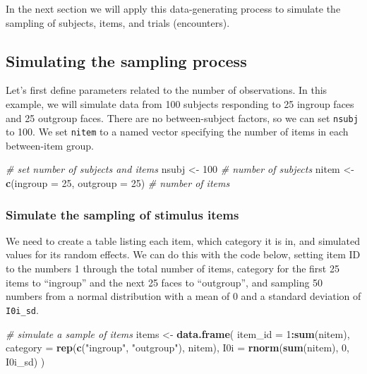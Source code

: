 \documentclass[doc,floatsintext]{apa6}
\newenvironment{Shaded}{\begin{snugshade}}{\end{snugshade}}
\newcommand{\CommentTok}[1]{\textcolor[rgb]{0.56,0.35,0.01}{\textit{#1}}}
\newcommand{\DataTypeTok}[1]{\textcolor[rgb]{0.13,0.29,0.53}{#1}}
\newcommand{\DecValTok}[1]{\textcolor[rgb]{0.00,0.00,0.81}{#1}}
\newcommand{\KeywordTok}[1]{\textcolor[rgb]{0.13,0.29,0.53}{\textbf{#1}}}
\newcommand{\NormalTok}[1]{#1}
\newcommand{\OperatorTok}[1]{\textcolor[rgb]{0.81,0.36,0.00}{\textbf{#1}}}
\newcommand{\StringTok}[1]{\textcolor[rgb]{0.31,0.60,0.02}{#1}}
\begin{document}
\noindent In the next section we will apply this data-generating process to simulate the sampling of subjects, items, and trials (encounters).

\hypertarget{simulating-the-sampling-process}{%
\subsection{Simulating the sampling process}\label{simulating-the-sampling-process}}

Let's first define parameters related to the number of observations. In this example, we will simulate data from 100 subjects responding to 25 ingroup faces and 25 outgroup faces. There are no between-subject factors, so we can set \texttt{nsubj} to 100. We set \texttt{nitem} to a named vector specifying the number of items in each between-item group.

\begin{Shaded}
\begin{Highlighting}[]
\CommentTok{# set number of subjects and items}
\NormalTok{nsubj  <-}\StringTok{ }\DecValTok{100} \CommentTok{# number of subjects}
\NormalTok{nitem  <-}\StringTok{ }\KeywordTok{c}\NormalTok{(}\DataTypeTok{ingroup =} \DecValTok{25}\NormalTok{, }\DataTypeTok{outgroup =} \DecValTok{25}\NormalTok{)  }\CommentTok{# number of items}
\end{Highlighting}
\end{Shaded}

\hypertarget{simulate-the-sampling-of-stimulus-items}{%
\subsubsection{Simulate the sampling of stimulus items}\label{simulate-the-sampling-of-stimulus-items}}

We need to create a table listing each item, which category it is in, and simulated values for its random effects. We can do this with the code below, setting item ID to the numbers 1 through the total number of items, category for the first 25 items to \enquote{ingroup} and the next 25 faces to \enquote{outgroup}, and sampling 50 numbers from a normal distribution with a mean of 0 and a standard deviation of \texttt{I0i\_sd}.

\begin{Shaded}
\begin{Highlighting}[]
\CommentTok{# simulate a sample of items}
\NormalTok{items <-}\StringTok{ }\KeywordTok{data.frame}\NormalTok{(}
  \DataTypeTok{item_id =} \DecValTok{1}\OperatorTok{:}\KeywordTok{sum}\NormalTok{(nitem),}
  \DataTypeTok{category =} \KeywordTok{rep}\NormalTok{(}\KeywordTok{c}\NormalTok{(}\StringTok{"ingroup"}\NormalTok{, }\StringTok{"outgroup"}\NormalTok{), nitem),}
  \DataTypeTok{I0i =} \KeywordTok{rnorm}\NormalTok{(}\KeywordTok{sum}\NormalTok{(nitem), }\DecValTok{0}\NormalTok{, I0i_sd)}
\NormalTok{)}
\end{Highlighting}
\end{Shaded}
\end{document}
